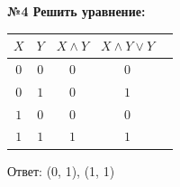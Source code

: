     \begin{center}
        \textbf{№4 Решить уравнение:}
    \end{center}

    \begin{tabular}{|c|c|c|c|c|}
        \hline
        $X$ & $Y$ & $X \wedge Y$ & $X \wedge Y \vee Y$ \\
        \hline
        $0$ & $0$ & $0$          & $0$                 \\
        \hline
        $0$ & $1$ & $0$          & $1$                 \\
        \hline
        $1$ & $0$ & $0$          & $0$                 \\
        \hline
        $1$ & $1$ & $1$          & $1$                 \\
        \hline
    \end{tabular}
    Ответ: (0, 1), (1, 1)

